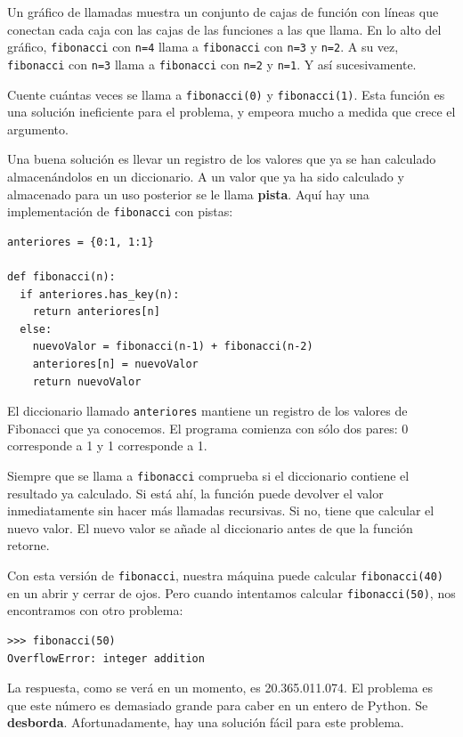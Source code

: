 Un gráfico de llamadas muestra un conjunto de cajas de función con líneas que conectan cada caja con las cajas de las funciones a las que llama. En lo alto del gráfico, \texttt{fibonacci} con \texttt{n=4} llama a \texttt{fibonacci} con \texttt{n=3} y \texttt{n=2}. A su vez, \texttt{fibonacci} con \texttt{n=3} llama a \texttt{fibonacci} con \texttt{n=2} y \texttt{n=1}. Y así sucesivamente.


Cuente cuántas veces se llama a \texttt{fibonacci(0)} y \texttt{fibonacci(1)}. Esta función es una solución ineficiente para
el problema, y empeora mucho a medida que crece el argumento.

Una buena solución es llevar un registro de los valores que ya se 
han calculado almacenándolos en un diccionario. A un valor que ya 
ha sido calculado y almacenado para un uso posterior se le llama 
{\bf pista}. Aquí hay una implementación de \texttt{fibonacci} con pistas:

\beforeverb
\begin{verbatim}
anteriores = {0:1, 1:1}

def fibonacci(n):
  if anteriores.has_key(n):
    return anteriores[n]
  else:
    nuevoValor = fibonacci(n-1) + fibonacci(n-2)
    anteriores[n] = nuevoValor
    return nuevoValor
\end{verbatim}
\afterverb
%
El diccionario llamado \texttt{anteriores} mantiene un registro de 
los valores de Fibonacci que ya conocemos. El programa comienza con 
sólo dos pares: 0 corresponde a 1 y 1 corresponde a 1.

Siempre que se llama a \texttt{fibonacci} comprueba si el diccionario 
contiene el resultado ya calculado.  Si está ahí, la función puede 
devolver el valor inmediatamente sin hacer más llamadas recursivas. 
Si no, tiene que calcular el nuevo valor. El nuevo valor se añade 
al diccionario antes de que la función retorne.

Con esta versión de \texttt{fibonacci}, nuestra máquina puede calcular 
\texttt{fibonacci(40)} en un abrir y cerrar de ojos. Pero cuando 
intentamos calcular \texttt{fibonacci(50)}, nos encontramos con otro 
problema:


\beforeverb
\begin{verbatim}
>>> fibonacci(50)
OverflowError: integer addition
\end{verbatim}
\afterverb
%
La respuesta, como se verá en un momento, es 20.365.011.074.  El problema es que este número es demasiado grande para caber en un entero de Python. Se {\bf desborda}. Afortunadamente, hay una solución fácil para este problema.


